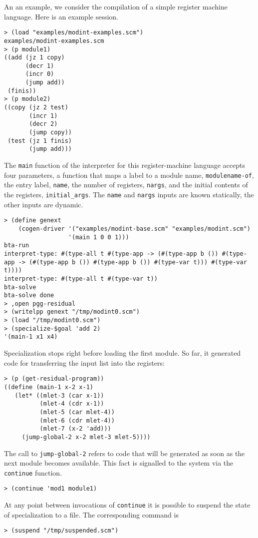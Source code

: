 \documentclass[11pt]{article}
\makeatletter
\newcommand{\indextt}[1]{\index{#1@\texttt{#1}}}
\makeatother
\begin{document}
An an example, we consider the compilation of a simple register machine
language. Here is an example session.
\begin{verbatim}
> (load "examples/modint-examples.scm")
examples/modint-examples.scm
> (p module1)
((add (jz 1 copy)
      (decr 1)
      (incr 0)
      (jump add))
 (finis))
> (p module2)
((copy (jz 2 test)
       (incr 1)
       (decr 2)
       (jump copy))
 (test (jz 1 finis)
       (jump add)))
\end{verbatim}
The \texttt{main} function of the interpreter for this register-machine
language accepts four parameters, a function that maps a label to a module
name, \texttt{modulename-of}, the  entry label, \texttt{name}, the number of
registers, \texttt{nargs}, and the
initial contents of the registers, \texttt{initial\_args}. The \texttt{name}
and \texttt{nargs}  inputs are known statically, the other inputs are dynamic. 
\begin{verbatim}
> (define genext
    (cogen-driver '("examples/modint-base.scm" "examples/modint.scm")
                  '(main 1 0 0 1)))
bta-run
interpret-type: #(type-all t #(type-app -> (#(type-app b ()) #(type-app -> (#(type-app b ()) #(type-app b ()) #(type-var t))) #(type-var t))))
interpret-type: #(type-all t #(type-var t))
bta-solve
bta-solve done
> ,open pgg-residual
> (writelpp genext "/tmp/modint0.scm")
> (load "/tmp/modint0.scm")
> (specialize-$goal 'add 2)
'(main-1 x1 x4)
\end{verbatim}
Specialization stops right before loading the first module. So far, it
generated code for transferring the input list into the registers:
\begin{verbatim}
> (p (get-residual-program))
((define (main-1 x-2 x-1)
   (let* ((mlet-3 (car x-1))
          (mlet-4 (cdr x-1))
          (mlet-5 (car mlet-4))
          (mlet-6 (cdr mlet-4))
          (mlet-7 (x-2 'add)))
     (jump-global-2 x-2 mlet-3 mlet-5))))
\end{verbatim}
The call to \texttt{jump-global-2} refers to code that will be generated as
soon as the next module becomes available. This fact is signalled to the system
via the 
\texttt{continue} function.\indextt{continue}
\begin{verbatim}
> (continue 'mod1 module1)
\end{verbatim}

At any point between invocations of \texttt{continue} it is possible to suspend 
the state of specialization to a file. The corresponding command is\indextt{suspend}
\begin{verbatim}
> (suspend "/tmp/suspended.scm")
\end{verbatim}
\end{document}
